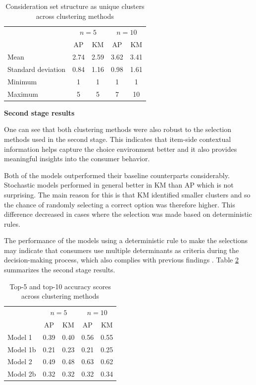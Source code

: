 \documentclass[a4paper,12pt]{article}
\begin{document}
\begin{table}[!h]
    \centering
    \begin{tabular}{lcccc}\hline
     & \multicolumn{2}{c}{$n=5$} & \multicolumn{2}{c}{$n=10$}\\
     & AP & KM & AP & KM\\\hline
    Mean & 2.74 & 2.59 & 3.62 & 3.41\\
    Standard deviation\hspace{5mm} & 0.84 & 1.16 & 0.98 & 1.61\\
    Minimum & 1 & 1 & 1 & 1\\
    Maximum & 5 & 5 & 7 & 10\\\hline
    \end{tabular}
    \caption{Consideration set structure as unique clusters across clustering methods}
    \label{tab:desciptiveResultsTwoStageChoiceModelFirstStage}
\end{table}

\textbf{Second stage results}

One can see that both clustering methods were also robust to the selection methods used in the second  stage. This indicates that item-side contextual information helps capture the choice environment better and it also provides meaningful insights into the consumer behavior.
 
Both of the models outperformed their baseline counterparts considerably. Stochastic models performed in general better in KM than AP which is not surprising. The main reason for this is that KM identified smaller clusters and so the chance of randomly selecting a correct option was therefore higher. This difference decreased in cases where the selection was made based on deterministic rules.

The performance of the models using a deterministic rule to make the selections may indicate that consumers use multiple determinants as criteria during the decision-making process, which also complies with previous findings \citep{bettman1979memory, lee2004effect}. Table \ref{tab:mainResultsTwoStageModeling} summarizes the second stage results.

\begin{table}
    \centering
    \begin{tabular}{lcccc}\hline
     & \multicolumn{2}{c}{$n=5$} & \multicolumn{2}{c}{$n=10$}\\
     & AP & KM & AP & KM\\\hline
    Model 1\hspace{20mm} & 0.39 & 0.40 & 0.56 & 0.55\\
    Model 1b & 0.21 & 0.23 & 0.21 & 0.25\\
    Model 2 & 0.49 & 0.48 & 0.63 & 0.62\\
    Model 2b & 0.32 & 0.32 & 0.32 & 0.34\\\hline
    \end{tabular}
    \caption{Top-5 and top-10 accuracy scores across clustering methods}
    \label{tab:mainResultsTwoStageModeling}
\end{table}
\end{document}
